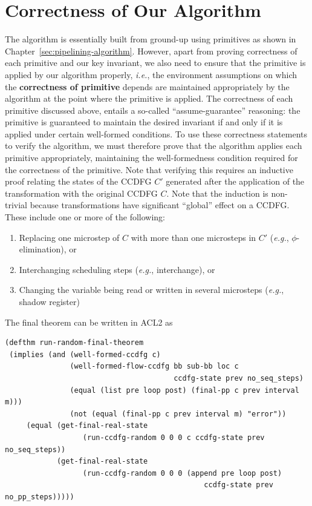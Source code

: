 \section{Correctness of Our Algorithm}

The algorithm is essentially built from ground-up using primitives
as shown in Chapter~\ref{sec:pipelining-algorithm}. However, 
apart from proving correctness of each primitive and our key 
invariant, we also need to ensure that the primitive is applied by 
our algorithm properly, {\em i.e.}, the environment
assumptions on which the {\bf correctness of primitive}
depends are maintained appropriately by the algorithm at
the point where the primitive is applied. 
The correctness of each primitive discussed above, entails a
so-called ``assume-guarantee'' reasoning: the primitive is
guaranteed to maintain the desired invariant if and only if
it is applied under certain well-formed conditions.  To use
these correctness statements to verify the algorithm, we
must therefore prove that the algorithm applies each
primitive appropriately, maintaining the well-formedness
condition required for the correctness of the primitive.
Note that verifying this requires an inductive proof
relating the states of the CCDFG $C'$ generated after the
application of the transformation with the original CCDFG
$C$. Note that the induction is non-trivial because
transformations have significant ``global'' effect on a
CCDFG. These include one or more of the following:

\begin{enumerate}
\item Replacing one microstep of $C$ with more than one
  microsteps in $C'$ ({\em e.g.}, $\phi$-elimination), or
\item Interchanging scheduling steps ({\em e.g.},
  interchange), or
\item Changing the variable being read or written in several
  microsteps ({\em e.g.}, shadow register)
\end{enumerate}

The final theorem can be written in ACL2 as 
\small
\begin{verbatim}
(defthm run-random-final-theorem
 (implies (and (well-formed-ccdfg c)
               (well-formed-flow-ccdfg bb sub-bb loc c 
                                       ccdfg-state prev no_seq_steps)
               (equal (list pre loop post) (final-pp c prev interval m)))
               (not (equal (final-pp c prev interval m) "error"))
     (equal (get-final-real-state 
                  (run-ccdfg-random 0 0 0 c ccdfg-state prev no_seq_steps))
            (get-final-real-state 
                  (run-ccdfg-random 0 0 0 (append pre loop post) 
                                              ccdfg-state prev no_pp_steps)))))
\end{verbatim}
\normalsize

